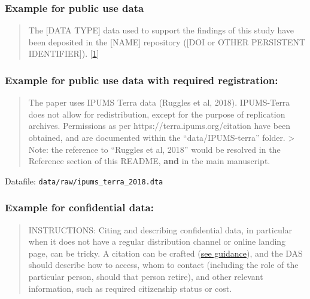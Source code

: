 \documentclass[
]{article}
\begin{document}
\hypertarget{example-for-public-use-data}{%
\subsubsection{Example for public use
data}\label{example-for-public-use-data}}

\begin{quote}
The {[}DATA TYPE{]} data used to support the findings of this study have
been deposited in the {[}NAME{]} repository ({[}DOI or OTHER PERSISTENT
IDENTIFIER{]}).
{[}\href{https://www.hindawi.com/research.data/\#statement.templates}{1}{]}
\end{quote}

\hypertarget{example-for-public-use-data-with-required-registration}{%
\subsubsection{Example for public use data with required
registration:}\label{example-for-public-use-data-with-required-registration}}

\begin{quote}
The paper uses IPUMS Terra data (Ruggles et al, 2018). IPUMS-Terra does
not allow for redistribution, except for the purpose of replication
archives. Permissions as per https://terra.ipums.org/citation have been
obtained, and are documented within the ``data/IPUMS-terra'' folder.
\textgreater{} Note: the reference to ``Ruggles et al, 2018'' would be
resolved in the Reference section of this README, \textbf{and} in the
main manuscript.
\end{quote}

Datafile: \texttt{data/raw/ipums\_terra\_2018.dta}

\hypertarget{example-for-confidential-data}{%
\subsubsection{Example for confidential
data:}\label{example-for-confidential-data}}

\begin{quote}
INSTRUCTIONS: Citing and describing confidential data, in particular
when it does not have a regular distribution channel or online landing
page, can be tricky. A citation can be crafted
(\href{FAQ.html\#data-citation-without-online-link}{see guidance}), and
the DAS should describe how to access, whom to contact (including the
role of the particular person, should that person retire), and other
relevant information, such as required citizenship status or cost.
\end{quote}
\end{document}
